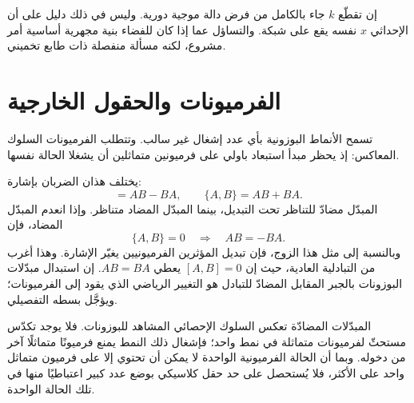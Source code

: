 إن تقطّع \(k\) جاء بالكامل من فرض دالة موجية دورية. وليس في ذلك دليل على أن الإحداثي \(x\) نفسه يقع على شبكة. والتساؤل عما إذا كان للفضاء بنية مجهرية أساسية أمر مشروع، لكنه مسألة منفصلة ذات طابع تخميني.

\section{الفرميونات والحقول الخارجية}

تسمح الأنماط البوزونية بأي عدد إشغال غير سالب. وتتطلب الفرميونات السلوك المعاكس: إذ يحظر مبدأ استبعاد باولي على فرميونين متماثلين أن يشغلا الحالة نفسها.

\begin{classroomqa}
\end{classroomqa}

يختلف هذان الضربان بإشارة:
\begin{equation}
[A,B]=AB-BA,
\qquad
\{A,B\}=AB+BA.
\end{equation}
المبدّل مضادّ للتناظر تحت التبديل، بينما المبدّل المضاد متناظر. وإذا انعدم المبدّل المضاد، فإن
\begin{equation}
\{A,B\}=0
\quad\Longrightarrow\quad
AB=-BA.
\end{equation}
وبالنسبة إلى مثل هذا الزوج، فإن تبديل المؤثرين الفرميونيين يغيّر الإشارة. وهذا أغرب من التبادلية العادية، حيث إن \([A,B]=0\) يعطي \(AB=BA\). إن استبدال مبدّلات البوزونات بالجبر المقابل المضادّ للتبادل هو التغيير الرياضي الذي يقود إلى الفرميونات؛ ويؤجَّل بسطه التفصيلي.

المبدّلات المضادّة تعكس السلوك الإحصائي المشاهد للبوزونات. فلا يوجد تكدّس مستحثّ لفرميونات متماثلة في نمط واحد؛ فإشغال ذلك النمط يمنع فرميونًا متماثلًا آخر من دخوله. وبما أن الحالة الفرميونية الواحدة لا يمكن أن تحتوي إلا على فرميون متماثل واحد على الأكثر، فلا يُستحصل على حد حقل كلاسيكي بوضع عدد كبير اعتباطيًا منها في تلك الحالة الواحدة.

\begin{classroomqa}
\end{classroomqa}

